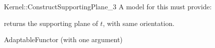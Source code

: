 \begin{ccRefFunctionObjectConcept}{Kernel::ConstructSupportingPlane_3}
A model for this must provide:


       {returns the supporting plane of $t$, with same orientation.}

\ccRefines
AdaptableFunctor (with one argument)

\ccSeeAlso
{} \\

\end{ccRefFunctionObjectConcept}
